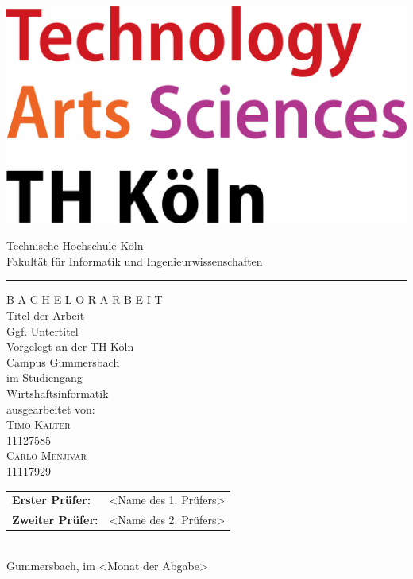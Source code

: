 \documentclass[a4paper,12pt,oneside]{article}
\begin{document}
  \pagestyle{empty} %
  \newpage %
  
  \newpage
  
  \pagestyle{empty}
  \begin{titlepage}
    \includegraphics[scale=0.20]{sources/TH_Koeln_Logo}\\
    \begin{center}
      \Large
      Technische Hochschule Köln\\
      Fakultät für Informatik und Ingenieurwissenschaften\\
      \hrule\par\rule{0pt}{2cm} %
      \LARGE
      \textsc{B A C H E L O R A R B E I T}\\
      \vspace{1cm} %
      \huge
      Titel der Arbeit\\
      \Large
      Ggf. Untertitel\\
      \vspace{1cm}
      \large
      Vorgelegt an der TH Köln\\
      Campus Gummersbach\\
      im Studiengang\\
      Wirtshaftsinformatik\\
      \vspace{1.0cm}
      ausgearbeitet von:\\
      \textsc{Timo Kalter}\\
      11127585\\
      \textsc{Carlo Menjivar}\\
      11117929\\
      \vspace{1.5cm}
      \begin{tabular}{ll} %
          \textbf{Erster Prüfer:} & <Name des 1. Prüfers> \\
          \textbf{Zweiter Prüfer:} & <Name des 2. Prüfers> \\
      \end{tabular}
      \vspace{1.5cm}
      \\Gummersbach, im <Monat der Abgabe>
    \end{center}    
  \end{titlepage}
  
\end{document}
